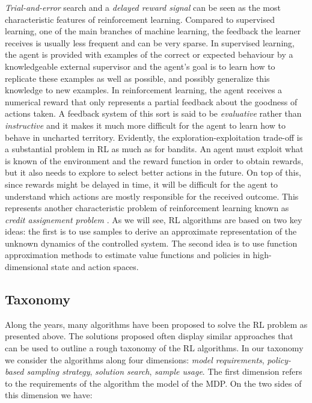 \emph{Trial-and-error} search and a \emph{delayed reward signal} can be
seen as the most characteristic features of reinforcement learning. Compared to supervised learning, one of the main branches of machine learning, the feedback the learner receives is usually less frequent and can be very sparse. In supervised learning, the agent is provided with examples of the correct or expected behaviour by a knowledgeable external supervisor and the agent’s goal is to learn how to replicate these examples as well as possible, and possibly generalize this knowledge to new examples. In reinforcement learning, the agent receives a numerical reward that only represents a partial feedback about the goodness of actions taken. A feedback system of this sort is said to be \emph{evaluative} rather than \emph{instructive} and it makes it much more difficult for the agent to learn how to behave in uncharted territory.
Evidently, the exploration-exploitation trade-off is a substantial problem in \gls{RL} as much as for bandits. An agent must exploit what
is known of the environment and the reward function in order to obtain rewards, but it also needs to explore to select better actions in the future. On top of this, since rewards might be delayed in time, it will be difficult for the agent to understand which actions are mostly responsible for the received outcome. This represents another characteristic problem of reinforcement learning known as \emph{credit assignement problem} \cite{sutton2018reinforcement}. As we will see, \gls{RL} algorithms are based on two key ideas: the first is to use samples to derive an approximate representation of the unknown dynamics of the controlled system. The second idea is to use function approximation methods to estimate value functions and policies in high-dimensional state and action spaces.

\subsection{Taxonomy}
Along the years, many algorithms have been proposed to solve the \gls{RL} problem as presented above. The solutions proposed often display similar approaches that can be used to outline a rough taxonomy of the \gls{RL} algorithms. In our taxonomy we consider the algorithms along four dimensions: \emph{model requirements}, \emph{policy-based sampling strategy}, \emph{solution search}, \emph{sample usage}.
The first dimension refers to the requirements of the algorithm \wrt the model of the \gls{MDP}. On the two sides of this dimension we have:

